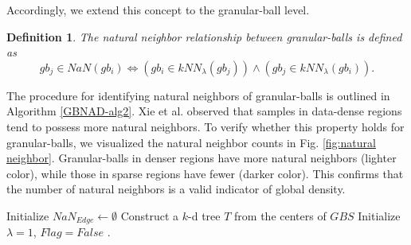 \documentclass[times, review, 10pt]{elsarticle}
\newtheorem{definition}{Definition}
\begin{document}
Accordingly, we extend this concept to the granular-ball level.
\begin{definition}
    The natural neighbor relationship between granular-balls is defined as
    \begin{equation}
        gb_j \in NaN(gb_i) \Leftrightarrow \left( gb_i \in kNN_\lambda(gb_j) \right) \land \left( gb_j \in kNN_\lambda(gb_i) \right).
    \end{equation}
\end{definition}

The procedure for identifying natural neighbors of granular-balls is outlined in Algorithm \ref{GBNAD-alg2}. Xie et al. \cite{xie2024adaptive} observed that samples in data-dense regions tend to possess more natural neighbors. To verify whether this property holds for granular-balls, we visualized the natural neighbor counts in Fig. \ref{fig:natural neighbor}. Granular-balls in denser regions have more natural neighbors (lighter color), while those in sparse regions have fewer (darker color). This confirms that the number of natural neighbors is a valid indicator of global density.
\begin{algorithm}[!ht]
		\caption{Granular-ball Natural Neighbor Search}
            \label{GBNAD-alg2}
		\LinesNumbered
            Initialize $NaN_{Edge} \leftarrow \emptyset$\;
            Construct a $k$-d tree $T$ from the centers of $GBS$\;
            Initialize $\lambda = 1$, $Flag = False$\;
            .
\end{algorithm}
\end{document}
